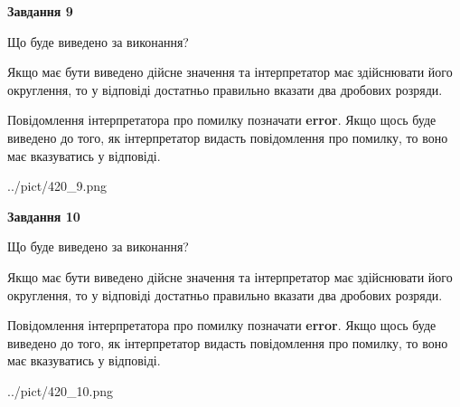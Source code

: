 \documentclass[12pt, ukrainian]{article}
\begin{document}
{\begin {Large}
{\begin {center}\textbf{Завдання 9}\end {center}}\par
Що буде виведено за виконання? \par

Якщо має бути виведено дійсне значення та інтерпретатор має здійснювати його округлення, 
то у відповіді достатньо правильно вказати два дробових розряди.

Повідомлення інтерпретатора про помилку позначати \textbf{error}.
Якщо щось буде виведено до того, як інтерпретатор видасть повідомлення про помилку, 
то воно має вказуватись у відповіді. \par

\begin{center}
	{../pict/420_9.png}
\end{center}
\newpage

{\begin {center}\textbf{Завдання 10}\end {center}}\par
Що буде виведено за виконання? \par

Якщо має бути виведено дійсне значення та інтерпретатор має здійснювати його округлення, 
то у відповіді достатньо правильно вказати два дробових розряди.

Повідомлення інтерпретатора про помилку позначати \textbf{error}.
Якщо щось буде виведено до того, як інтерпретатор видасть повідомлення про помилку, 
то воно має вказуватись у відповіді. \par

\begin{center}
	{../pict/420_10.png}
\end{center}
\newpage

\end {Large}}
\end{document}
